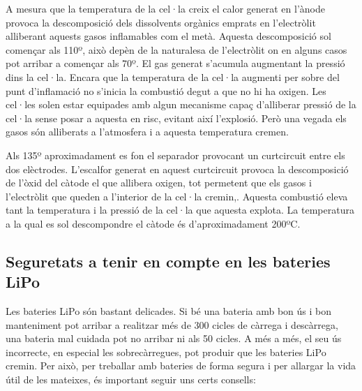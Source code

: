 A mesura que la temperatura de la cel·la creix el calor generat en l'ànode provoca la descomposició dels dissolvents orgànics emprats en l'electròlit alliberant aquests gasos inflamables com el metà. Aquesta descomposició sol començar als 110º, això depèn de la naturalesa de l'electròlit on en alguns casos pot arribar a començar als 70º. El gas generat s'acumula augmentant la pressió dins la cel·la. Encara que la temperatura de la cel·la augmenti per sobre del punt d'inflamació no s'inicia la combustió degut a que no hi ha oxigen. Les cel·les solen estar equipades amb algun mecanisme capaç d'alliberar pressió de la cel·la sense posar a aquesta en risc, evitant així l'explosió. Però una vegada els gasos són alliberats a l'atmosfera i a aquesta temperatura cremen.

Als 135º aproximadament es fon el separador provocant un curtcircuit entre els dos elèctrodes. L'escalfor generat en aquest curtcircuit provoca la descomposició de l'òxid del càtode el que allibera oxigen, tot permetent que els gasos i l'electròlit que queden a l'interior de la cel·la cremin,. Aquesta combustió eleva tant la temperatura i la pressió de la cel·la que aquesta explota. La temperatura a la qual es sol descompondre el càtode és d'aproximadament 200ºC.

\subsection{Seguretats a tenir en compte en les bateries LiPo}

Les bateries LiPo són bastant delicades. Si bé una bateria amb bon ús i bon manteniment pot arribar a realitzar més de 300 cicles de càrrega i descàrrega, una bateria mal cuidada pot no arribar ni als 50 cicles. A més a més, el seu ús incorrecte, en especial les sobrecàrregues, pot produir que les bateries LiPo cremin. Per això, per treballar amb bateries de forma segura i per allargar la vida útil de les mateixes, és important seguir uns certs consells:

